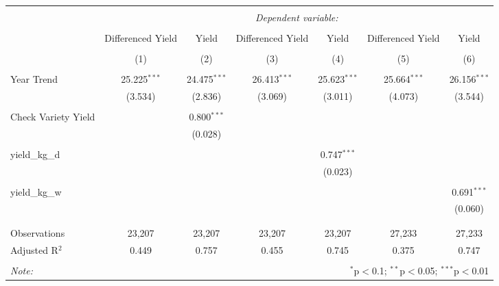
\begin{table}[!htbp] \centering 
  \caption{} 
  \label{} 
\begin{tabular}{@{\extracolsep{5pt}}lcccccc} 
\\[-1.8ex]\hline 
\hline \\[-1.8ex] 
 & \multicolumn{6}{c}{\textit{Dependent variable:}} \\ 
\cline{2-7} 
\\[-1.8ex] & Differenced Yield & Yield & Differenced Yield & Yield & Differenced Yield & Yield \\ 
\\[-1.8ex] & (1) & (2) & (3) & (4) & (5) & (6)\\ 
\hline \\[-1.8ex] 
 Year Trend & 25.225$^{***}$ & 24.475$^{***}$ & 26.413$^{***}$ & 25.623$^{***}$ & 25.664$^{***}$ & 26.156$^{***}$ \\ 
  & (3.534) & (2.836) & (3.069) & (3.011) & (4.073) & (3.544) \\ 
  & & & & & & \\ 
 Check Variety Yield &  & 0.800$^{***}$ &  &  &  &  \\ 
  &  & (0.028) &  &  &  &  \\ 
  & & & & & & \\ 
 yield\_kg\_d &  &  &  & 0.747$^{***}$ &  &  \\ 
  &  &  &  & (0.023) &  &  \\ 
  & & & & & & \\ 
 yield\_kg\_w &  &  &  &  &  & 0.691$^{***}$ \\ 
  &  &  &  &  &  & (0.060) \\ 
  & & & & & & \\ 
\hline \\[-1.8ex] 
Observations & 23,207 & 23,207 & 23,207 & 23,207 & 27,233 & 27,233 \\ 
Adjusted R$^{2}$ & 0.449 & 0.757 & 0.455 & 0.745 & 0.375 & 0.747 \\ 
\hline 
\hline \\[-1.8ex] 
\textit{Note:}  & \multicolumn{6}{r}{$^{*}$p$<$0.1; $^{**}$p$<$0.05; $^{***}$p$<$0.01} \\ 
\end{tabular} 
\end{table} 

